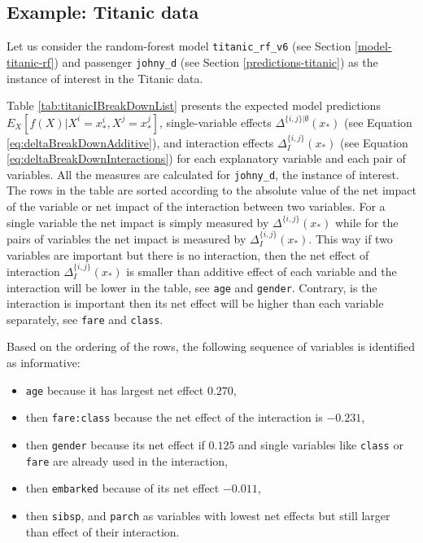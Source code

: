 \documentclass[12pt,]{krantz}
\providecommand{\tightlist}{%
  \setlength{\itemsep}{0pt}\setlength{\parskip}{0pt}}
\begin{document}
\hypertarget{iBDExample}{%
\subsection{Example: Titanic data}\label{iBDExample}}

Let us consider the random-forest model \texttt{titanic\_rf\_v6} (see Section \ref{model-titanic-rf}) and passenger \texttt{johny\_d} (see Section \ref{predictions-titanic}) as the instance of interest in the Titanic data.

Table \ref{tab:titanicIBreakDownList} presents the expected model predictions \(E_X[f(X)|X^i = x_*^i, X^j = x_*^j]\), single-variable effects \(\Delta^{\{i,j\}|\emptyset}(x_*)\) (see Equation \eqref{eq:deltaBreakDownAdditive}), and interaction effects \(\Delta_{I}^{\{i,j\}}(x_*)\) (see Equation \eqref{eq:deltaBreakDownInteractions}) for each explanatory variable and each pair of variables. All the measures are calculated for \texttt{johny\_d}, the instance of interest.
The rows in the table are sorted according to the absolute value of the net impact of the variable or net impact of the interaction between two variables. For a single variable the net impact is simply measured by \(\Delta^{\{i,j\}}(x_*)\) while for the pairs of variables the net impact is measured by \(\Delta_{I}^{\{i,j\}}(x_*)\). This way if two variables are important but there is no interaction, then the net effect of interaction \(\Delta_{I}^{\{i,j\}}(x_*)\) is smaller than additive effect of each variable and the interaction will be lower in the table, see \texttt{age} and \texttt{gender}. Contrary, is the interaction is important then its net effect will be higher than each variable separately, see \texttt{fare} and \texttt{class}.

Based on the ordering of the rows, the following sequence of variables is identified as informative:

\begin{itemize}
\tightlist
\item
  \texttt{age} because it has largest net effect \(0.270\),
\item
  then \texttt{fare:class} because the net effect of the interaction is \(-0.231\),
\item
  then \texttt{gender} because its net effect if \(0.125\) and single variables like \texttt{class} or \texttt{fare} are already used in the interaction,
\item
  then \texttt{embarked} because of its net effect \(-0.011\),
\item
  then \texttt{sibsp}, and \texttt{parch} as variables with lowest net effects but still larger than effect of their interaction.
\end{itemize}
\end{document}
